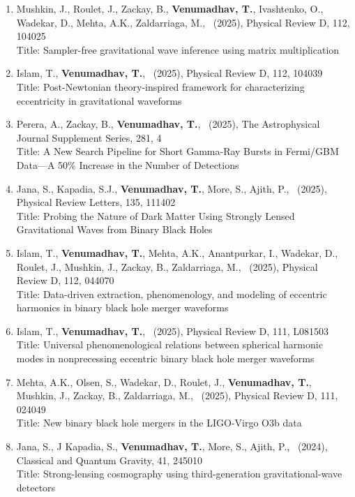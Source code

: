 \documentclass{article}
\newlength{\cvindent}
\newenvironment{cvlist}{%
  \begin{list}{}{%
    \setlength{\leftmargin}{\cvindent}%
    \setlength{\rightmargin}{0pt}%
    \setlength{\topsep}{0pt}%
    \setlength{\partopsep}{0pt}%
    \setlength{\parsep}{0pt}%
    \setlength{\itemsep}{0pt}%
  }%
  \item\relax
}{%
  \end{list}
}
\begin{document}
\begin{cvlist}
\begin{enumerate}[leftmargin=*,itemsep=0.32em,topsep=0.3em]
Title: Binary black hole population inference combining confident and marginal events from the IAS-HM search pipeline
\item Mushkin, J., Roulet, J., Zackay, B., \textbf{Venumadhav, T.}, Ivashtenko, O., Wadekar, D., Mehta, A.K., Zaldarriaga, M., \ (2025), Physical Review D, 112, 104025 \\
Title: Sampler-free gravitational wave inference using matrix multiplication
\item Islam, T., \textbf{Venumadhav, T.}, \ (2025), Physical Review D, 112, 104039 \\
Title: Post-Newtonian theory-inspired framework for characterizing eccentricity in gravitational waveforms
\item Perera, A., Zackay, B., \textbf{Venumadhav, T.}, \ (2025), The Astrophysical Journal Supplement Series, 281, 4 \\
Title: A New Search Pipeline for Short Gamma-Ray Bursts in Fermi/GBM Data—A 50\% Increase in the Number of Detections
\item Jana, S., Kapadia, S.J., \textbf{Venumadhav, T.}, More, S., Ajith, P., \ (2025), Physical Review Letters, 135, 111402 \\
Title: Probing the Nature of Dark Matter Using Strongly Lensed Gravitational Waves from Binary Black Holes
\item Islam, T., \textbf{Venumadhav, T.}, Mehta, A.K., Anantpurkar, I., Wadekar, D., Roulet, J., Mushkin, J., Zackay, B., Zaldarriaga, M., \ (2025), Physical Review D, 112, 044070 \\
Title: Data-driven extraction, phenomenology, and modeling of eccentric harmonics in binary black hole merger waveforms
\item Islam, T., \textbf{Venumadhav, T.}, \ (2025), Physical Review D, 111, L081503 \\
Title: Universal phenomenological relations between spherical harmonic modes in nonprecessing eccentric binary black hole merger waveforms
\item Mehta, A.K., Olsen, S., Wadekar, D., Roulet, J., \textbf{Venumadhav, T.}, Mushkin, J., Zackay, B., Zaldarriaga, M., \ (2025), Physical Review D, 111, 024049 \\
Title: New binary black hole mergers in the LIGO-Virgo O3b data
\item Jana, S., J Kapadia, S., \textbf{Venumadhav, T.}, More, S., Ajith, P., \ (2024), Classical and Quantum Gravity, 41, 245010 \\
Title: Strong-lensing cosmography using third-generation gravitational-wave detectors

\end{enumerate}
\end{cvlist}
\end{document}
